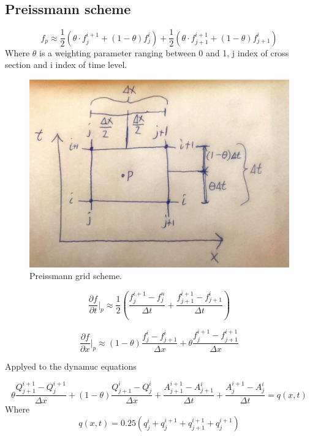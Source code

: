 \subsection{Preissmann scheme}\label{subse:preissmann_scheme}




\begin{equation}\label{eq:approximated_function}
	f_p \approx \frac{1}{2} (\theta \cdot f_j^{i+1}+(1-\theta)f_j^i)+\frac{1}{2}(\theta\cdot f_{j+1}^{i+1}+(1-\theta)f_{j+1}^i)
\end{equation}
Where $\theta$ is a weighting parameter ranging between 0 and 1, j index of cross section and i index of time level. 

\begin{figure}[H]
\centering
\includegraphics[width=.6\textwidth]{report/modeling/pictures/preissmann_scheme}
\caption{Preissmann grid scheme.}
\label{fig:preissmann_grid_scheme}%
\end{figure} 


\begin{equation}\label{eq:preissmann_time_derivatie}
	\frac{\partial f}{\partial t}\bigg \rvert_p \approx \frac{1}{2}\left(\frac{f_j^{i+1}-f_j^n}{\Delta t}+\frac{f_{j+1}^{i+1}-f_{j+1}^i}{\Delta t}\right)
\end{equation}

\begin{equation}\label{eq:preissmann_space_derivatie}
	\frac{\partial f}{\partial x}\bigg \rvert_p \approx (1-\theta)\frac{f_j^i-f_{j+1}^i}{\Delta x}+\theta \frac{f_j^{i+1}-f_{j+1}^{i+1}}{\Delta x}
\end{equation}

Applyed to the dynamuc equations 

\begin{equation}\label{eq:continuity_eq_preissmann}
	\theta \frac{Q_{j+1}^{i+1}-Q_j^{i+1}}{\Delta x}+(1-\theta)\frac{Q_{j+1}^i - Q_j^i}{\Delta x}+
	\frac{A_{j+1}^{i+1}-A_{j+1}^i}{\Delta t}+\frac{A_{j}^{i+1} - A_j^i}{\Delta t} = q(x,t)
\end{equation}
Where 
\begin{equation}
	q(x,t) = 0.25(q_j^i+q_j^{i+1}+q_{j+1}^{i+1}+q_j^{i+1})	
\end{equation}


